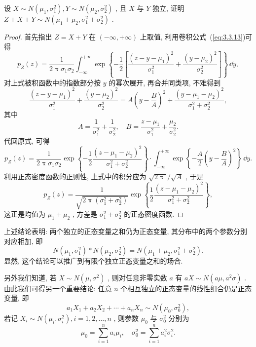    \begin{example}[(正态分布的可加性)]\label{exam:3.3.6}
   	设 $X\sim N(\mu_1,\sigma_1^2),Y\sim N(\mu_2,\sigma_2^2)$ , 且 $X$ 与 $Y$ 独立, 证明 $Z+X+Y\sim N(\mu_1+\mu_2,\sigma_1^2+\sigma_2^2)$ .
   	\begin{proof}
   		首先指出 $Z=X+Y$ 在 $(-\infty,+\infty)$ 上取值, 利用卷积公式~(\ref{eq:3.3.13})可得
   		\begin{equation*}
   			p_Z(z)=\frac{1}{2\uppi\sigma_1\sigma_2}\int_{-\infty}^{+\infty}\exp\left\{-\frac{1}{2}\left[\frac{(z-y-\mu_1)^2}{\sigma_1^2}+\frac{(y-\mu_2)^2}{\sigma_2^2}\right]\right\}\,\dd y,
   		\end{equation*}
   		对上式被积函数中的指数部分按 $y$ 的幂次展开, 再合并同类项, 不难得到
   		\begin{equation*}
   			\frac{(z-y-\mu_1)^2}{\sigma_1^2}+\frac{(y-\mu_2)^2}{\sigma_2^2}=A\left(y-\frac{B}{A}\right)^2+\frac{(y-\mu_1-\mu_2)^2}{\sigma_1^2+\sigma_2^2},
   		\end{equation*}
   		其中
   		\begin{equation*}
   			A=\frac{1}{\sigma_1^2}+\frac{1}{\sigma_2^2},\quad B=\frac{z-\mu_1}{\sigma_1^2}+\frac{\mu_2}{\sigma_2^2}.
   		\end{equation*}
   		代回原式, 可得
   		\begin{equation*}
   			p_Z(z)=\frac{1}{2\uppi\sigma_1\sigma_2}\exp\left\{-\frac{1}{2}\frac{(z-\mu_1-\mu_2)^2}{\sigma_1^2+\sigma_2^2}\right\}\cdot\int_{-\infty}^{+\infty}\exp\left\{-\frac{A}{2}\left(y-\frac{B}{A}\right)^2\right\}\,\dd y.
   		\end{equation*}
   		利用正态密度函数的正则性, 上式中的积分应为 $\sqrt{2\uppi}/\sqrt{A}$ , 于是
   		\begin{equation*}
   			p_Z(z)=\frac{1}{\sqrt{2\uppi(\sigma_1^2+\sigma_2^2)}}\exp\left\{\frac{1}{2}\frac{(z-\mu_1-\mu_2)^2}{\sigma_1^2+\sigma_2^2}\right\},
   		\end{equation*}
   		这正是均值为 $\mu_1+\mu_2$ , 方差是 $\sigma_1^2+\sigma_2^2$ 的正态密度函数.
   	\end{proof}
   \end{example}
   上述结论表明: 两个独立的正态变量之和仍为正态变量, 其分布中的两个参数分别对应相加, 即
   \begin{equation}\label{eq:3.3.14}
   	N(\mu_1,\sigma_1^2)\ast N(\mu_2,\sigma_2^2)=N(\mu_1+\mu_2,\sigma_1^2+\sigma_2^2).
   \end{equation}
   显然, 这个结论可以推广到有限个独立正态变量之和的场合.
   
   另外我们知道, 若 $X\sim N(\mu,\sigma^2)$ , 则对任意非零实数 $a$ 有 $aX\sim N(a\mu,a^2\sigma)$ . 由此我们可得另一个重要结论: 任意 $n$ 个相互独立的正态变量的线性组合仍是正态变量, 即
   \begin{equation}\label{eq:3.3.15}
   	a_1X_1+a_2X_2+\cdots+a_nX_n\sim N(\mu_0,\sigma_0^2),
   \end{equation}
   若记 $X_i\sim N(\mu_i,\sigma_i^2),i=1,2,\ldots,n$ , 则参数 $\mu_0$ 与 $\sigma_0^2$ 分别为
   \begin{equation*}
   	\mu_0=\sum_{i=1}^{n}a_i\mu_i,\quad \sigma_0^2=\sum_{i=1}^{n}a_i^2\sigma_i^2.
   \end{equation*}
   
